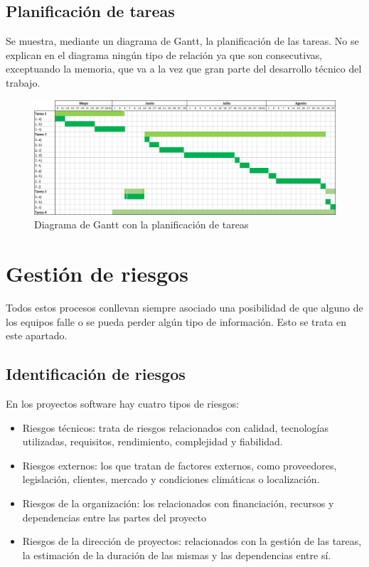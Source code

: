 \documentclass[12pt,a4paper,onecolumn,oneside]{report}
\begin{document}
\subsection{Planificación de tareas}

Se muestra, mediante un diagrama de Gantt, la planificación de las tareas. No se explican en el diagrama ningún tipo de relación ya que son consecutivas, exceptuando la memoria, que va a la vez que gran parte del desarrollo técnico del trabajo.

\begin{figure}[H] 
\centering
  \includegraphics[width=1\textwidth]{figuras/gantt.png}
  \caption[Diagrama de \textit{Gantt} con la planificación de tareas]{Diagrama de Gantt con la planificación de tareas\\
  }
  \label{fig:diagramagantt}
\end{figure}


\section{Gestión de riesgos}

Todos estos procesos conllevan siempre asociado una posibilidad de que alguno de los equipos falle o se pueda perder algún tipo de información. Esto se trata en este apartado.

\subsection{Identificación de riesgos}

En los proyectos software hay cuatro tipos de riesgos:

\begin{itemize}

\item Riesgos técnicos: trata de riesgos relacionados con calidad, tecnologías utilizadas, requisitos, rendimiento, complejidad y fiabilidad.
\item Riesgos externos: los que tratan de factores externos, como proveedores, legislación, clientes, mercado y condiciones climáticas o localización.
\item Riesgos de la organización: los relacionados con financiación, recursos y dependencias entre las partes del proyecto
\item Riesgos de la dirección de proyectos: relacionados con la gestión de las tareas, la estimación de la duración de las mismas y las dependencias entre sí.

\end{itemize}
\end{document}
